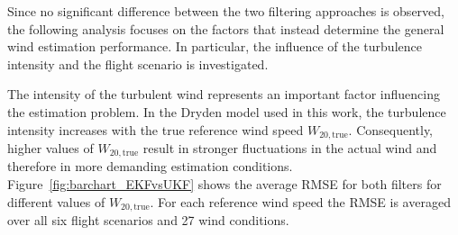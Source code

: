 Since no significant difference between the two filtering approaches is observed, the following analysis focuses on the factors that instead determine the general wind estimation performance. In particular, the influence of the turbulence intensity and the flight scenario is investigated.

The intensity of the turbulent wind represents an important factor influencing the estimation problem. In the Dryden model used in this work, the turbulence intensity increases with the true reference wind speed $W_{20,\mathrm{true}}$. Consequently, higher values of $W_{20,\mathrm{true}}$ result in stronger fluctuations in the actual wind and therefore in more demanding estimation conditions. Figure~\ref{fig:barchart_EKFvsUKF} shows the average RMSE for both filters for different values of $W_{20,\mathrm{true}}$. For each reference wind speed the RMSE is averaged over all six flight scenarios and 27 wind conditions.

